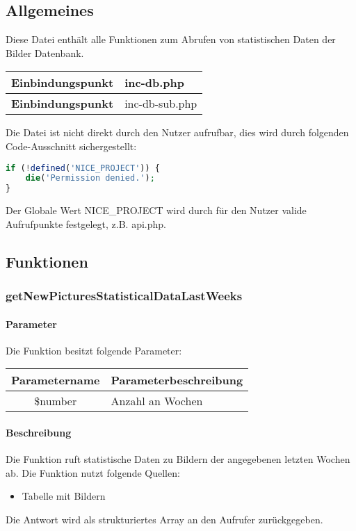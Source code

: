 \subsection{Allgemeines} Diese Datei enthält alle Funktionen zum Abrufen von statistischen Daten der Bilder Datenbank.
\begin{table}[H]
	\begin{tabular}{|c|p{11cm}|}
		\hline
		\textbf{Einbindungspunkt} & inc-db.php \\ \hline
		\textbf{Einbindungspunkt} & inc-db-sub.php \\ \hline
	\end{tabular}
\end{table}
Die Datei ist nicht direkt durch den Nutzer aufrufbar, dies wird durch folgenden Code-Ausschnitt sichergestellt:
\begin{lstlisting}[language=php]
if (!defined('NICE_PROJECT')) {
	die('Permission denied.');
}
\end{lstlisting}
Der Globale Wert {\glqq NICE\_PROJECT\grqq} wird durch für den Nutzer valide Aufrufpunkte festgelegt, z.B. {\glqq api.php\grqq}.
\newpage
\subsection{Funktionen}
\subsubsection{getNewPicturesStatisticalDataLastWeeks}
\paragraph{Parameter} Die Funktion besitzt folgende Parameter:
\begin{table}[H]
	\begin{tabular}{|c|p{11cm}|}
		\hline
		\textbf{Parametername} & \textbf{Parameterbeschreibung} \\ \hline
		\$number & Anzahl an Wochen \\ \hline
	\end{tabular}
\end{table}
\paragraph{Beschreibung} Die Funktion ruft statistische Daten zu Bildern der angegebenen letzten Wochen ab. Die Funktion nutzt folgende Quellen:
\begin{itemize}
	\item Tabelle mit Bildern
\end{itemize}
Die Antwort wird als strukturiertes Array an den Aufrufer zurückgegeben.
